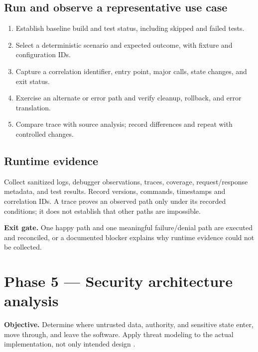 \documentclass[11pt,letterpaper]{article}
\newcommand{\gate}[1]{\par\noindent\colorbox{pale}{\parbox{\dimexpr\linewidth-2\fboxsep\relax}{\textbf{\color{teal}Exit gate.} #1}}\par}
\begin{document}
\subsection{Run and observe a representative use case}
\begin{enumerate}
\item Establish baseline build and test status, including skipped and failed tests.
\item Select a deterministic scenario and expected outcome, with fixture and configuration IDs.
\item Capture a correlation identifier, entry point, major calls, state changes, and exit status.
\item Exercise an alternate or error path and verify cleanup, rollback, and error translation.
\item Compare trace with source analysis; record differences and repeat with controlled changes.
\end{enumerate}
\begin{center}
\end{center}
\subsection{Runtime evidence}
Collect sanitized logs, debugger observations, traces, coverage, request/response metadata, and test results. Record versions, commands, timestamps and correlation IDs. A trace proves an observed path only under its recorded conditions; it does not establish that other paths are impossible.
\gate{One happy path and one meaningful failure/denial path are executed and reconciled, or a documented blocker explains why runtime evidence could not be collected.}
\clearpage
\section{Phase 5 --- Security architecture analysis}
\textbf{Objective.} Determine where untrusted data, authority, and sensitive state enter, move through, and leave the software. Apply threat modeling to the actual implementation, not only intended design \cite{owasp}.
\end{document}
